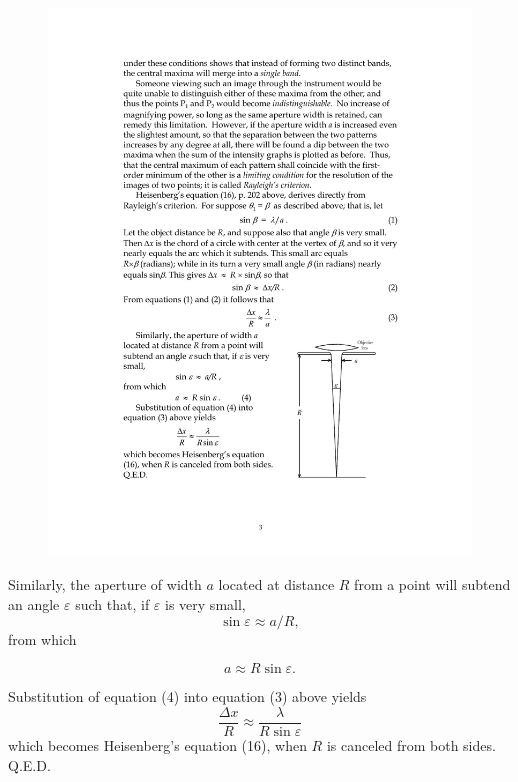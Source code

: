 \begin{figure}
\includegraphics{images/10_heisenberg/Figure4SSD.pdf}
\end{figure}
Similarly, the aperture of width $a$ located at distance $R$
from a point will subtend an angle $\varepsilon$ such that, if $\varepsilon$ is
very small,
%
\begin{equation*}
\sin \varepsilon \approx a/R,
\end{equation*}
%
from which

\begin{equation}
a \approx R \sin \varepsilon. %
\end{equation}

Substitution of equation (4) into equation (3) above yields
%
\begin{equation*}
\frac{\Delta x}{R} \approx \frac{\lambda}{R \sin \varepsilon}
\end{equation*}
%
which becomes Heisenberg's equation (16), when $R$ is canceled from
both sides. Q.E.D.

